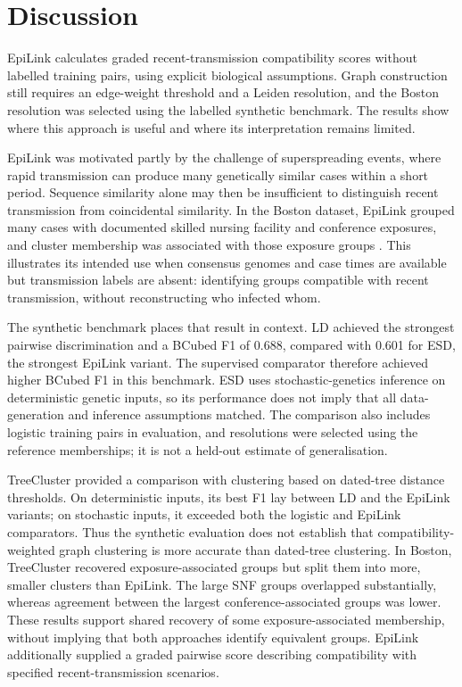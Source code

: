 \section{Discussion}\label{sec:ch3_discussion}

EpiLink calculates graded recent-transmission compatibility scores without labelled training pairs, using explicit biological assumptions. Graph construction still requires an edge-weight threshold and a Leiden resolution, and the Boston resolution was selected using the labelled synthetic benchmark. The results show where this approach is useful and where its interpretation remains limited.

EpiLink was motivated partly by the challenge of superspreading events, where rapid transmission can produce many genetically similar cases within a short period. Sequence similarity alone may then be insufficient to distinguish recent transmission from coincidental similarity. In the Boston dataset, EpiLink grouped many cases with documented skilled nursing facility and conference exposures, and cluster membership was associated with those exposure groups \citep{Lemieux2021}. This illustrates its intended use when consensus genomes and case times are available but transmission labels are absent: identifying groups compatible with recent transmission, without reconstructing who infected whom.

The synthetic benchmark places that result in context. LD achieved the strongest pairwise discrimination and a BCubed F1 of 0.688, compared with 0.601 for ESD, the strongest EpiLink variant. The supervised comparator therefore achieved higher BCubed F1 in this benchmark. ESD uses stochastic-genetics inference on deterministic genetic inputs, so its performance does not imply that all data-generation and inference assumptions matched. The comparison also includes logistic training pairs in evaluation, and resolutions were selected using the reference memberships; it is not a held-out estimate of generalisation.

TreeCluster provided a comparison with clustering based on dated-tree distance thresholds. On deterministic inputs, its best F1 lay between LD and the EpiLink variants; on stochastic inputs, it exceeded both the logistic and EpiLink comparators. Thus the synthetic evaluation does not establish that compatibility-weighted graph clustering is more accurate than dated-tree clustering. In Boston, TreeCluster recovered exposure-associated groups but split them into more, smaller clusters than EpiLink. The large SNF groups overlapped substantially, whereas agreement between the largest conference-associated groups was lower. These results support shared recovery of some exposure-associated membership, without implying that both approaches identify equivalent groups. EpiLink additionally supplied a graded pairwise score describing compatibility with specified recent-transmission scenarios.%

